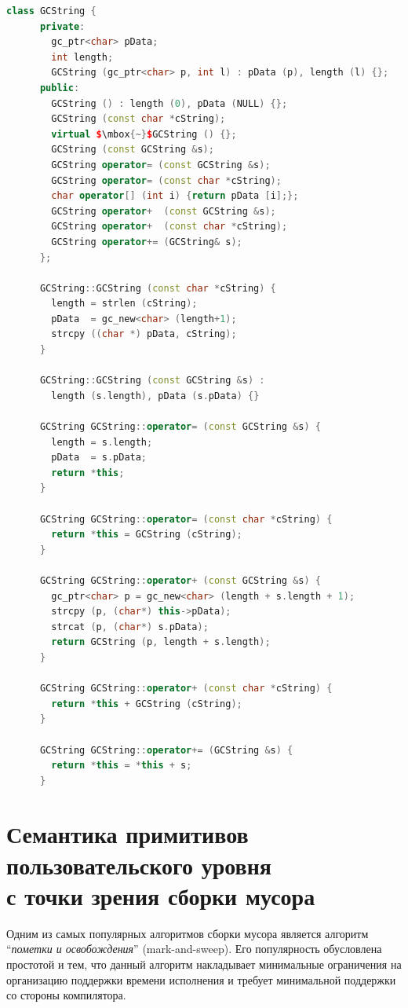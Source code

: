 \begin{lstlisting}[mathescape=true,language=C++]
    class GCString {
      private:
        gc_ptr<char> pData; 	
        int length;	 
        GCString (gc_ptr<char> p, int l) : pData (p), length (l) {};     
      public:
        GCString () : length (0), pData (NULL) {};
        GCString (const char *cString);
        virtual $\mbox{~}$GCString () {};
        GCString (const GCString &s);
        GCString operator= (const GCString &s);
        GCString operator= (const char *cString);
        char operator[] (int i) {return pData [i];};
        GCString operator+  (const GCString &s);
        GCString operator+  (const char *cString);
        GCString operator+= (GCString& s);
      };

      GCString::GCString (const char *cString) {
        length = strlen (cString);
        pData  = gc_new<char> (length+1);
        strcpy ((char *) pData, cString);
      }

      GCString::GCString (const GCString &s) : 
        length (s.length), pData (s.pData) {}

      GCString GCString::operator= (const GCString &s) {
        length = s.length;
        pData  = s.pData;
        return *this;
      }

      GCString GCString::operator= (const char *cString) {
        return *this = GCString (cString);
      }

      GCString GCString::operator+ (const GCString &s) {
        gc_ptr<char> p = gc_new<char> (length + s.length + 1);
        strcpy (p, (char*) this->pData);
        strcat (p, (char*) s.pData);
        return GCString (p, length + s.length);
      }

      GCString GCString::operator+ (const char *cString) {
        return *this + GCString (cString);
      }

      GCString GCString::operator+= (GCString &s) {
        return *this = *this + s;
      }
\end{lstlisting}

\section{Семантика примитивов\\
пользовательского уровня\\
с точки зрения сборки мусора}

Одним из самых популярных алгоритмов сборки мусора является  алгоритм ``\emph{пометки и 
освобождения}'' (mark-and-sweep). Его популярность обусловлена простотой и тем, что 
данный алгоритм накладывает минимальные ограничения на организацию поддержки времени
исполнения и требует минимальной поддержки со стороны компилятора. 

